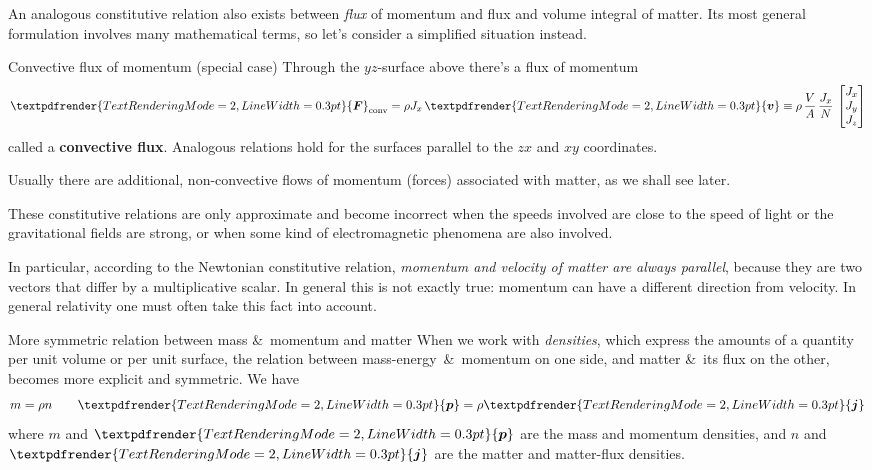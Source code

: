 \documentclass[a4paper,12pt,%
onecolumn,oneside,titlepage,%
british%
]{memoir}
\newcommand*{\amp}{\&}
\renewcommand*{\bm}[1]{\textpdfrender{TextRenderingMode=2,LineWidth=0.3pt}{\boldsymbol{#1}}}
\renewcommand*{\|}[1][]{\nonscript\:#1\vert\nonscript\:\mathopen{}}
\newcommand*{\yv}{\bm{v}}
\newcommand*{\yN}{N}
\newcommand*{\yJ}{J}
\newcommand*{\yn}{n}
\newcommand*{\yj}{\bm{j}}
\newcommand*{\yrho}{\rho}
\newcommand*{\yM}{M}%
\newcommand*{\ym}{m}%
\newcommand*{\yp}{\bm{p}}
\newcommand*{\yF}{\bm{F}}
\newcommand*{\masse}{mass-energy}
\begin{document}
\bigskip

An analogous constitutive relation also exists between \emph{flux} of momentum and flux and volume integral of matter. Its most general formulation involves many mathematical terms, so let's consider a simplified situation instead.
\begin{definition}{Convective flux of momentum (special case)}
Through the $yz$-surface above there's a flux of momentum
  \begin{equation}
    \label{eq:matterflux_force_Newton}
    \yF_{\text{conv}} = \yrho J_{x}\,\yv \equiv
    \yrho\, \frac{V}{A}\,\frac{J_{x}}{\yN}\,
  \begin{bmatrix}
    J_{x}\\J_{y}\\J_{z}
  \end{bmatrix}
  \end{equation}
  called a \textbf{convective flux}. Analogous relations hold for the surfaces parallel to the $zx$ and $xy$ coordinates.
\end{definition}
\begin{warning}
  Usually there are additional, non-convective flows of momentum (forces) associated with matter, as we shall see later.
\end{warning}

These constitutive relations are only approximate and become incorrect when the speeds involved are close to the speed of light or the gravitational fields are strong, or when some kind of electromagnetic phenomena are also involved.

In particular, according to the Newtonian constitutive relation, \emph{momentum and velocity of matter are always parallel}, because they are two vectors that differ by a multiplicative scalar. In general this is not exactly true: momentum can have a different direction from velocity. In general relativity one must often take this fact into account.

\begin{extra}{More symmetric relation between mass \amp\ momentum and matter}
  When we work with \emph{densities}, which express the amounts of a quantity per unit volume or per unit surface, the relation between \masse\ \amp\ momentum on one side, and matter \amp\ its flux on the other, becomes more explicit and symmetric. We have
  \begin{equation*}
    \ym = \rho\yn \qquad \yp = \rho\yj
  \end{equation*}
  where $\ym$ and $\yp$ are the mass and momentum densities, and $\yn$ and $\yj$ are the matter and matter-flux densities.
\end{extra}
\end{document}
